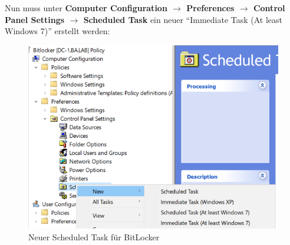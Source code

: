 Nun muss unter \textbf{Computer Configuration $\rightarrow$ Preferences $\rightarrow$ Control Panel Settings $\rightarrow$ Scheduled Task} ein neuer ``Immediate Task (At least Windows 7)'' erstellt werden:
\begin{figure}[H]
    \centering
    \includegraphics[width=0.7\linewidth]{../img/Encryption/new-scheduled-task.png}
    \caption{Neuer Scheduled Task für BitLocker}
\end{figure}

